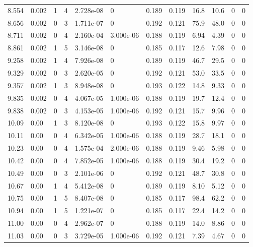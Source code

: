 \documentclass[preview]{standalone}
\begin{document}
{{{\begin{tabular}{L{1.2cm}C{1.2cm} C{0.3cm}C{0.5cm} C{1.4cm}C{1.4cm} C{1.4cm}C{1.4cm} C{1.6cm}C{1.6cm} C{1.6cm}C{1.6cm}}
  8.554  &  0.002  & 1     &  4 &  2.728e-08  & 0  &  0.189&   0.119& 16.8 & 10.6   &  0 & 0  \\ 
  8.656  &  0.002  & 0     &  3 &  1.711e-07  & 0  &  0.192&   0.121& 75.9 & 48.0   &  0 & 0  \\ 
  8.711  &  0.002  & 0     &  4 &  2.160e-04  & 3.000e-06  &  0.188&   0.119& 6.94 & 4.39   &  0 & 0  \\ 
  8.861  &  0.002  & 1     &  5 &  3.146e-08  & 0  &  0.185&   0.117& 12.6 & 7.98   &  0 & 0  \\ 
  9.258  &  0.002  & 1     &  4 &  7.926e-08  & 0  &  0.189&   0.119& 46.7 & 29.5   &  0 & 0  \\ 
  9.329  &  0.002  & 0     &  3 &  2.620e-05  & 0  &  0.192&   0.121& 53.0 & 33.5   &  0 & 0  \\ 
  9.357  &  0.002  & 1     &  3 &  8.948e-08  & 0  &  0.193&   0.122& 14.8 & 9.33   &  0 & 0  \\ 
  9.835  &  0.002  & 0     &  4 &  4.067e-05  & 1.000e-06  &  0.188&   0.119& 19.7 & 12.4   &  0 & 0  \\ 
  9.838  &  0.002  & 0     &  3 &  4.153e-05  & 1.000e-06  &  0.192&   0.121& 15.7 & 9.96   &  0 & 0  \\ 
  10.09  &  0.00  & 1     &  3 &  8.120e-08  & 0  &  0.193&   0.122& 15.8 & 9.97   &  0 & 0  \\ 
  10.11  &  0.00  & 0     &  4 &  6.342e-05  & 1.000e-06  &  0.188&   0.119& 28.7 & 18.1   &  0 & 0  \\ 
  10.23  &  0.00  & 0     &  4 &  1.575e-04  & 2.000e-06  &  0.188&   0.119& 9.46 & 5.98   &  0 & 0  \\ 
  10.42  &  0.00  & 0     &  4 &  7.852e-05  & 1.000e-06  &  0.188&   0.119& 30.4 & 19.2   &  0 & 0  \\ 
  10.49  &  0.00  & 0     &  3 &  2.101e-06  & 0  &  0.192&   0.121& 48.7 & 30.8   &  0 & 0  \\ 
  10.67  &  0.00  & 1     &  4 &  5.412e-08  & 0  &  0.189&   0.119& 8.10 & 5.12   &  0 & 0  \\ 
  10.75  &  0.00  & 1     &  5 &  8.407e-08  & 0  &  0.185&   0.117& 98.4 & 62.2   &  0 & 0  \\ 
  10.94  &  0.00  & 1     &  5 &  1.221e-07  & 0  &  0.185&   0.117& 22.4 & 14.2   &  0 & 0  \\ 
  11.00  &  0.00  & 0     &  4 &  2.962e-07  & 0  &  0.188&   0.119& 14.0 & 8.86   &  0 & 0  \\ 
  11.03  &  0.00  & 0     &  3 &  3.729e-05  & 1.000e-06  &  0.192&   0.121& 7.39 & 4.67   &  0 & 0  \\ 

\end{tabular}}}}
\end{document}
